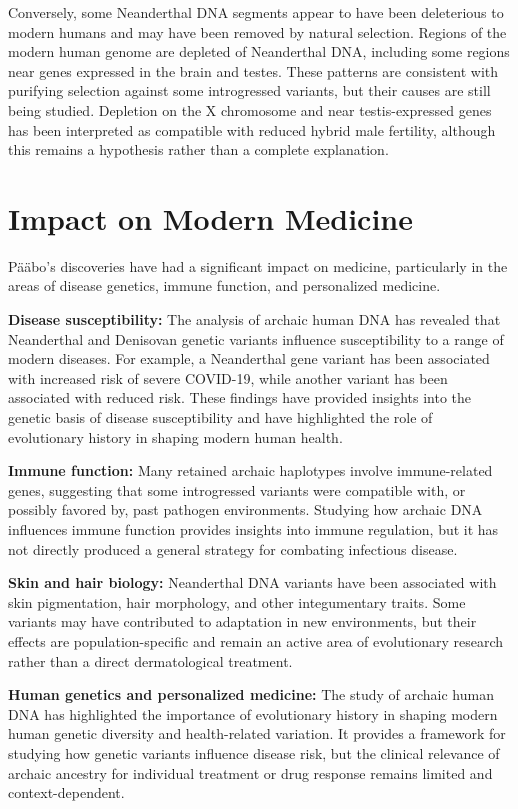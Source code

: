 Conversely, some Neanderthal DNA segments appear to have been deleterious to modern humans and may have been removed by natural selection. Regions of the modern human genome are depleted of Neanderthal DNA, including some regions near genes expressed in the brain and testes. These patterns are consistent with purifying selection against some introgressed variants, but their causes are still being studied. Depletion on the X chromosome and near testis-expressed genes has been interpreted as compatible with reduced hybrid male fertility, although this remains a hypothesis rather than a complete explanation.

\section{Impact on Modern Medicine}

P\"a\"abo's discoveries have had a significant impact on medicine, particularly in the areas of disease genetics, immune function, and personalized medicine.

\textbf{Disease susceptibility:} The analysis of archaic human DNA has revealed that Neanderthal and Denisovan genetic variants influence susceptibility to a range of modern diseases. For example, a Neanderthal gene variant has been associated with increased risk of severe COVID-19, while another variant has been associated with reduced risk. These findings have provided insights into the genetic basis of disease susceptibility and have highlighted the role of evolutionary history in shaping modern human health.

\textbf{Immune function:} Many retained archaic haplotypes involve immune-related genes, suggesting that some introgressed variants were compatible with, or possibly favored by, past pathogen environments. Studying how archaic DNA influences immune function provides insights into immune regulation, but it has not directly produced a general strategy for combating infectious disease.

\textbf{Skin and hair biology:} Neanderthal DNA variants have been associated with skin pigmentation, hair morphology, and other integumentary traits. Some variants may have contributed to adaptation in new environments, but their effects are population-specific and remain an active area of evolutionary research rather than a direct dermatological treatment.

\textbf{Human genetics and personalized medicine:} The study of archaic human DNA has highlighted the importance of evolutionary history in shaping modern human genetic diversity and health-related variation. It provides a framework for studying how genetic variants influence disease risk, but the clinical relevance of archaic ancestry for individual treatment or drug response remains limited and context-dependent.

